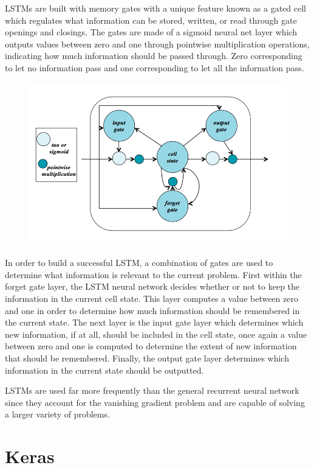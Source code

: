 LSTMs are built with memory gates with a unique feature known as a gated cell which regulates what information can be stored, written, or read through gate openings and closings. The gates are made of a sigmoid neural net layer which outputs values between zero and one through pointwise multiplication operations, indicating how much information should be passed through. Zero corresponding to let no information pass and one corresponding to let all the information pass. \cite{nicholson} \cite{olah}
\begin{figure}[H]
\includegraphics[width=\columnwidth]{LSTMCell}
\end{figure}
In order to build a successful LSTM, a combination of gates are used to determine what information is relevant to the current problem. First within the forget gate layer, the LSTM neural network decides whether or not to keep the information in the current cell state. This layer computes a value between zero and one in order to determine how much information should be remembered in the current state. The next layer is the input gate layer which determines which new information, if at all, should be included in the cell state, once again a value between zero and one is computed to determine the extent of new information that should be remembered. Finally, the output gate layer determines which information in the current state should be outputted. \cite{nicholson}\cite{olah}

LSTMs are used far more frequently than the general recurrent neural network since they account for the vanishing gradient problem and are capable of solving a larger variety of problems.
\section{Keras}\label{models}

